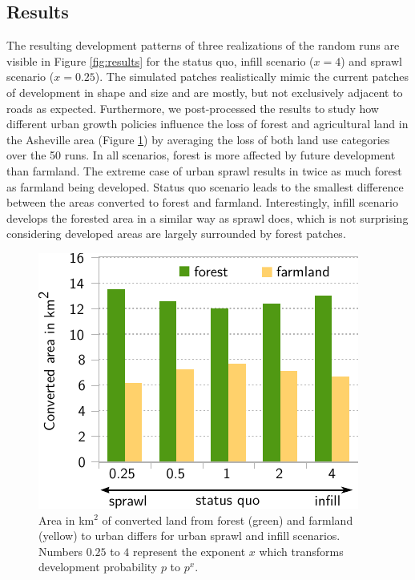 \documentclass{isprs}
\begin{document}
\subsection{Results}
The resulting development patterns of three realizations of the random runs
are visible in Figure \ref{fig:results}
for the status quo, infill scenario ($x = 4$) and sprawl scenario ($x=0.25$).
The simulated patches realistically mimic the current patches of development in shape and size
and are mostly, but not exclusively adjacent to roads as expected.
Furthermore, we post-processed the results to study how different urban growth policies
influence the loss of forest and agricultural land in the Asheville area
(Figure \ref{fig:results_plot})
by averaging the loss of both land use categories over the 50 runs.
In all scenarios, forest is more affected by future development than farmland.
The extreme case of urban sprawl results in twice as much forest as farmland being developed.
Status quo scenario leads to the smallest difference between the areas converted to forest and farmland.
Interestingly, infill scenario develops the forested area in a similar way as sprawl does, which 
is not surprising considering developed areas are largely surrounded by forest patches.

\begin{figure}[!ht]
 \centering
 \includegraphics[width=0.9\columnwidth]{./figures/converted_land_new.pdf}
 \caption{Area in km$^2$ of converted land from forest (green) and farmland (yellow) to urban
 differs for urban sprawl and infill scenarios. Numbers $0.25$ to $4$ represent the exponent $x$ which
 transforms development probability $p$ to $p^x$.}
 \label{fig:results_plot}
\end{figure}
\end{document}
